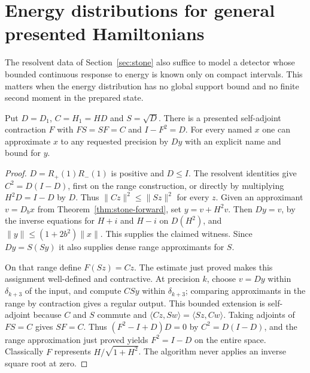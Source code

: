 \section{Energy distributions for general presented Hamiltonians}\label{sec:unbounded-calculus}
The resolvent data of Section~\ref{sec:stone} also suffice to model a detector whose bounded continuous response to energy is known only on compact intervals. This matters when the energy distribution has no global support bound and no finite second moment in the prepared state.

\begin{lemma}
Put $D=D_1$, $C=H_1=HD$ and $S=\sqrt D$. There is a presented self-adjoint contraction $F$ with $FS=SF=C$ and $I-F^2=D$. For every named $x$ one can approximate $x$ to any requested precision by $Dy$ with an explicit name and bound for $y$.
\end{lemma}
\begin{proof}
$D=R_+(1)R_-(1)$ is positive and $D\le I$. The resolvent identities give $C^2=D(I-D)$, first on the range construction, or directly by multiplying $H^2D=I-D$ by $D$. Thus $\|Cz\|^2\le\|Sz\|^2$ for every $z$. Given an approximant $v=D_bx$ from Theorem~\ref{thm:stone-forward}, set $y=v+H^2v$. Then $Dy=v$, by the inverse equations for $H+i$ and $H-i$ on $D(H^2)$, and $\|y\|\le(1+2b^2)\|x\|$. This supplies the claimed witness. Since $Dy=S(Sy)$ it also supplies dense range approximants for $S$.

On that range define $F(Sz)=Cz$. The estimate just proved makes this assignment well-defined and contractive. At precision $k$, choose $v=Dy$ within $\delta_{k+3}$ of the input, and compute $C S y$ within $\delta_{k+3}$; comparing approximants in the range by contraction gives a regular output. This bounded extension is self-adjoint because $C$ and $S$ commute and $\langle Cz,Sw\rangle=\langle Sz,Cw\rangle$. Taking adjoints of $FS=C$ gives $SF=C$. Thus $(F^2-I+D)D=0$ by $C^2=D(I-D)$, and the range approximation just proved yields $F^2=I-D$ on the entire space. Classically $F$ represents $H/\sqrt{1+H^2}$. The algorithm never applies an inverse square root at zero.
\end{proof}

